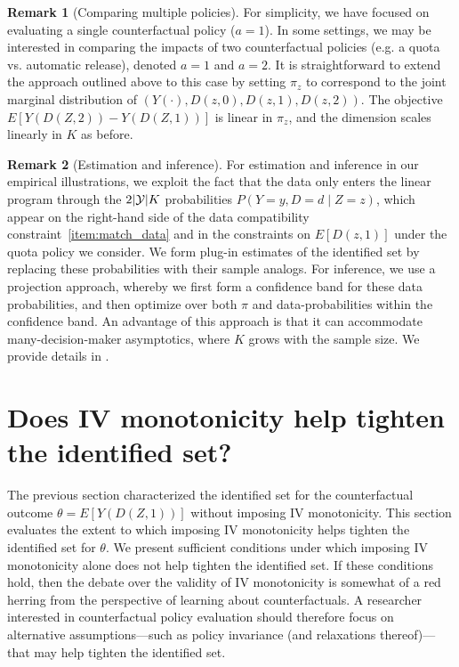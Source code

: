 \documentclass[12pt]{article}%
\theoremstyle{definition}
\newtheorem{remark}{Remark}
\DeclarePairedDelimiter\abs{\lvert}{\rvert}
\newcommand\1{\operatorname{I}\indicatorfence}
\begin{document}
\begin{remark}[Comparing multiple policies]
For simplicity, we have focused on evaluating a single counterfactual policy ($a=1$). In some settings, we may be interested in comparing the impacts of two counterfactual policies (e.g. a quota vs. automatic release), denoted $a=1$ and $a=2$. It is straightforward to extend the approach outlined above to this case by setting $\pi_z$ to correspond to the joint marginal distribution of $(Y(\cdot), D(z,0), D(z,1), D(z,2))$. The objective $E[ Y(D(Z,2)) - Y(D(Z,1))]$ is linear in $\pi_z$, and the dimension scales linearly in $K$ as before.
\end{remark}

\begin{remark}[Estimation and inference]
  For estimation and inference in our empirical illustrations, we exploit the
  fact that the data only enters the linear program through the
  $2\abs{\mathcal{Y}}K$ probabilities $P(Y=y,D=d\mid Z=z)$, which appear on the
  right-hand side of the data compatibility constraint~\ref{item:match_data} and in the constraints on $E[D(z,1)]$ under the quota policy we consider. We form plug-in estimates of the identified set by replacing these probabilities with their sample
  analogs. For inference, we use a projection approach, whereby we first form a
  confidence band for these data probabilities, and then optimize over both $\pi$ and data-probabilities within the confidence band. An advantage of this approach is that it can
  accommodate many-decision-maker asymptotics, where $K$ grows with the sample
  size. We provide details in .
\end{remark}

\section{Does IV monotonicity help tighten the identified set?}\label{sec:iv_monotonicity}

The previous section characterized the identified set for the counterfactual
outcome $\theta = E[Y(D(Z,1))]$ without imposing IV monotonicity. This section evaluates the extent to which imposing IV monotonicity helps tighten the identified set for $\theta$. We present
sufficient conditions under which imposing IV monotonicity alone does
not help tighten the identified set. If these conditions hold, then
the debate over the validity of IV monotonicity is somewhat of a red
herring from the perspective of learning about counterfactuals. A
researcher interested in counterfactual policy evaluation should therefore focus on alternative assumptions---such as policy invariance
(and relaxations thereof)---that may help tighten the identified set.
\end{document}
